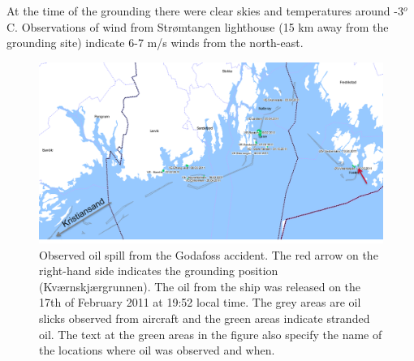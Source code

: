 At the time of the grounding there were clear skies and temperatures around -3$^o$C. Observations of wind from Str{\o}mtangen lighthouse (15 km away from the grounding site) indicate 6-7 m/s winds from the north-east.

\begin{figure}[ht]
\centerline{
\includegraphics*[width=\textwidth]{Figurer/Godafoss}
}
\caption{\small
Observed oil spill from the Godafoss accident. The red arrow on the right-hand side indicates the grounding position (Kv{\ae}rnskj{\ae}rgrunnen). The oil from the ship was released on the 17th of February 2011 at 19:52 local time. The grey areas are oil slicks observed from aircraft and the green areas indicate stranded oil. The text at the green areas in the figure also specify the name of the locations where oil was observed and when.}
\label{fig:godafoss_oil}
\end{figure}


\newpage
\clearpage

